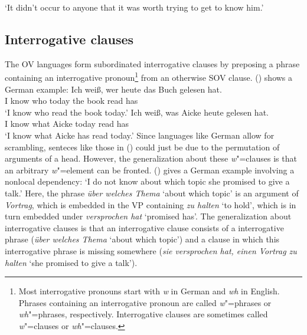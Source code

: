 \zl
\ea 
{}
\glt `It didn't occur to anyone that it was worth trying to get to know him.'
\z

\subsection{Interrogative clauses}
\label{sec-phen-interrogatives}

The OV languages form subordinated interrogative clauses by preposing a phrase containing an
interrogative pronoun\footnote{
Most interrogative pronouns start with \emph{w} in German and \emph{wh} in English. Phrases
containing an interrogative pronoun are called \emph{w}"=phrases or \emph{wh}"=phrases,
respectively. Interrogative clauses are sometimes called \emph{w}"=clauses or \emph{wh}"=clauses.
} from an
otherwise SOV clause. () shows a German example:
\eal
\ex 
\gll Ich weiß, wer heute das Buch gelesen hat.\\
     I know    who today the book read has\\
\glt `I know who read the book today.'
\ex 
\gll Ich weiß, was Aicke heute gelesen hat.\\
     I know    what Aicke today read has\\
\glt `I know what Aicke has read today.'
\zl
Since languages like German allow for scrambling, senteces like those in () could just be due
to the permutation of arguments of a head. However, the generalization about these \emph{w}"=clauses
is that an arbitrary \emph{w}"=element can be fronted. () gives a German example involving a nonlocal dependency:
\ea
\label{ex-wissen-Vortrag-halen-nonlocal}
\longexampleandlanguage{
\gll Ich weiß nicht, [über welches Thema]$_i$ sie versprochen hat, [[einen Vortrag \_$_i$] zu halten].\\
     I know not      \spacebr about which topic she promised has \hspaceThis{[[}a talk to  hold\\}{German}
\glt `I do not know about which topic she promised to give a talk.'
\z
Here, the phrase \emph{über welches Thema} `about which topic' is an argument of \emph{Vortrag},
which is embedded in the VP containing \emph{zu halten} `to hold', which is in turn embedded under
\emph{versprochen hat} `promised has'. The generalization about interrogative clauses is that an
interrogative clause consists of a interrogative phrase (\emph{über welches Thema} `about which
topic') and a clause in which this interrogative phrase is missing somewhere (\emph{sie versprochen
  hat, einen Vortrag zu halten} `she promised to give a talk').


